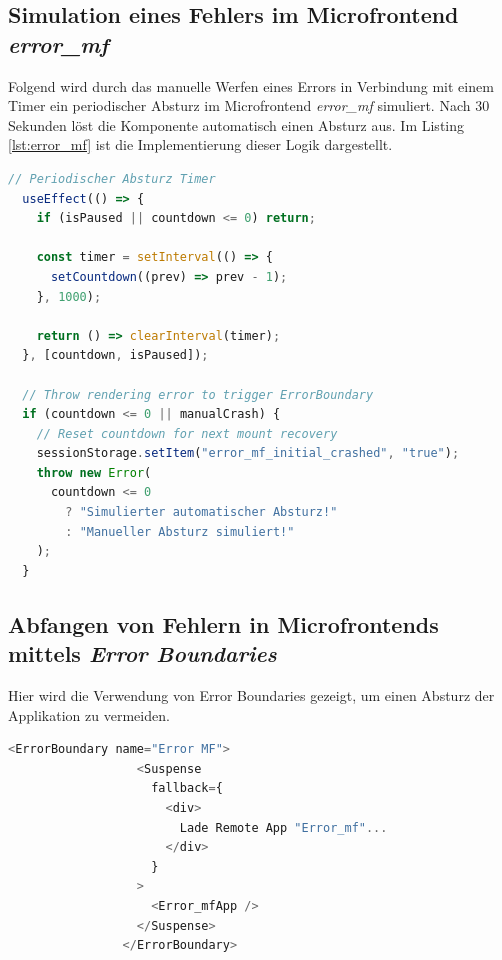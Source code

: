 \subsection{Simulation eines Fehlers im Microfrontend \textit{error\_mf}}

Folgend wird durch das manuelle Werfen eines Errors in Verbindung mit einem Timer ein periodischer Absturz im Microfrontend \textit{error\_mf} simuliert.
Nach 30 Sekunden löst die Komponente automatisch einen Absturz aus. Im Listing \ref{lst:error_mf} ist die Implementierung dieser Logik dargestellt.

\begin{lstlisting}[language=Javascript, caption={Periodischer Absturz eines Microfrontends}, label={lst:error_mf}]
  // Periodischer Absturz Timer
  useEffect(() => {
    if (isPaused || countdown <= 0) return;

    const timer = setInterval(() => {
      setCountdown((prev) => prev - 1);
    }, 1000);

    return () => clearInterval(timer);
  }, [countdown, isPaused]);

  // Throw rendering error to trigger ErrorBoundary
  if (countdown <= 0 || manualCrash) {
    // Reset countdown for next mount recovery
    sessionStorage.setItem("error_mf_initial_crashed", "true");
    throw new Error(
      countdown <= 0
        ? "Simulierter automatischer Absturz!"
        : "Manueller Absturz simuliert!"
    );
  }
\end{lstlisting}
\subsection{Abfangen von Fehlern in Microfrontends mittels \textit{Error Boundaries}}

Hier wird die Verwendung von Error Boundaries gezeigt, um einen Absturz der Applikation zu vermeiden.

\begin{lstlisting}[language=Javascript, caption={Nutzen von Error Boundaries}, label={lst:error_boundry_mf}]
            <ErrorBoundary name="Error MF">
                  <Suspense
                    fallback={
                      <div>
                        Lade Remote App "Error_mf"...
                      </div>
                    }
                  >
                    <Error_mfApp />
                  </Suspense>
                </ErrorBoundary>
\end{lstlisting}
